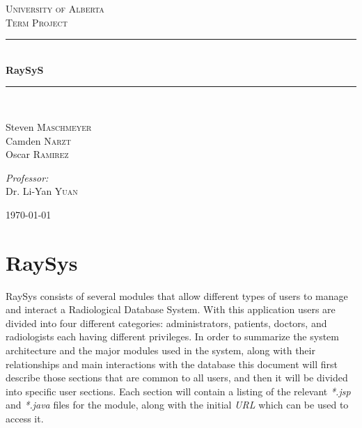 \documentclass[12pt]{report}
\newcommand{\HRule}{\rule{\linewidth}{0.5mm}}
\begin{document}
\begin{titlepage}

\begin{center}


\textsc{\LARGE University of Alberta}\\[1.5cm]

\textsc{\Large Term Project}\\[0.5cm]


\HRule \\[0.4cm]
{ \huge \bfseries RaySyS}\\[0.4cm]

\HRule \\[1.5cm]

\begin{minipage}{0.4\textwidth}
\begin{flushleft} \large
Steven  \textsc{Maschmeyer}\\
Camden  \textsc{Narzt}\\
Oscar  \textsc{Ramirez}
\end{flushleft}
\end{minipage}
\begin{minipage}{0.4\textwidth}
\begin{flushright} \large
\emph{Professor:} \\
Dr. Li-Yan \textsc{Yuan}
\end{flushright}


\end{minipage}

\vfill

{\large \today}

\end{center}

\end{titlepage}
\chapter*{RaySys}
RaySys consists of several modules that allow different types of users to manage and interact a Radiological Database System. With this application users are divided into four different categories: administrators, patients, doctors, and radiologists each having different privileges. In order to summarize the system architecture and the major modules used in the system, along with their relationships and main interactions with the database this document will first describe those sections that are common to all users, and then it will be divided into specific user sections. Each section will contain a listing of the relevant \emph{*.jsp} and \emph{*.java} files for the module, along with the initial \emph{URL} which can be used to access it.
\end{document}
